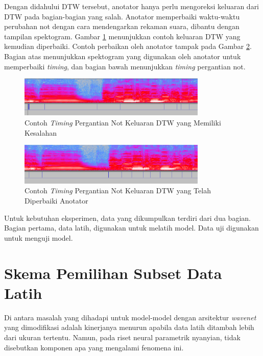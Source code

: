 Dengan didahului DTW tersebut, anotator hanya perlu mengoreksi keluaran dari DTW pada bagian-bagian yang salah. Anotator memperbaiki waktu-waktu perubahan not dengan cara mendengarkan rekaman suara, dibantu dengan tampilan spektogram. Gambar \ref{dtw-output-example} menunjukkan contoh keluaran DTW yang kemudian diperbaiki. Contoh perbaikan oleh anotator tampak pada Gambar \ref{dtw-output-example-corrected}. Bagian atas menunjukkan spektogram yang digunakan oleh anotator untuk memperbaiki \textit{timing}, dan bagian bawah menunjukkan \textit{timing} pergantian not.

\begin{figure}[htb]
  \centering
  \includegraphics[width=0.8\textwidth]{resources/DTW-output-example.png}
  \caption{Contoh \textit{Timing} Pergantian Not Keluaran DTW yang Memiliki Kesalahan} \label{dtw-output-example}
\end{figure}

\begin{figure}[htb]
  \centering
  \includegraphics[width=0.8\textwidth]{resources/DTW-output-corrected-example.png}
  \caption{Contoh \textit{Timing} Pergantian Not Keluaran DTW yang Telah Diperbaiki Anotator} \label{dtw-output-example-corrected}
\end{figure}

Untuk kebutuhan eksperimen, data yang dikumpulkan terdiri dari dua bagian. Bagian pertama, data latih, digunakan untuk melatih model. Data uji digunakan untuk menguji model.

\section{Skema Pemilihan Subset Data Latih}\label{subsetselectionsection}

Di antara masalah yang dihadapi untuk model-model dengan arsitektur \textit{wavenet} yang dimodifikasi adalah kinerjanya menurun apabila data latih ditambah lebih dari ukuran tertentu. Namun, pada riset neural parametrik nyanyian, tidak disebutkan komponen apa yang mengalami fenomena ini.

